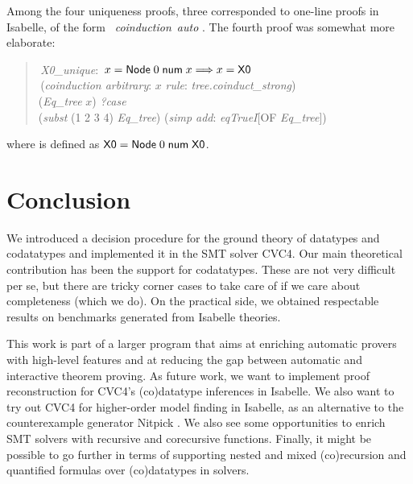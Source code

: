 Among the four uniqueness proofs, three corresponded to one-line
proofs in Isabelle, of the form ~\textit{coinduction}~\textit{auto}
\cite{blanchette-et-al-2014-impl}. The fourth proof was somewhat more elaborate:
%
\begin{quote}
 \,\textit{X0\_unique}: \,$x = \textsf{Node}\;0\;\textsf{num}\; x \Longrightarrow x = \textsf{X0}$ \\
 \,(\textit{coinduction arbitrary}: $x$ \textit{rule}: \textit{tree.coinduct\_strong}) \\
\noindent\hbox{}\quad  {} (\textit{Eq\_tree} $x$)  \textit{?case} \\
\noindent\hbox{}\qquad  {} (\textit{subst} (1 2 3 4) \textit{Eq\_tree}) (\textit{simp add}: \textit{eqTrueI}[OF \textit{Eq\_tree}]) \\
\end{quote}
%
\noindent
where  is defined as $\textsf{X0} =
\textsf{Node}\;0\;\textsf{num}\;\textsf{X0}$.

\section{Conclusion}
\label{sec:conclusion}

We introduced a decision procedure for the ground theory of datatypes and
codatatypes and implemented it in the SMT solver CVC4. Our main theoretical
contribution has been the support for codatatypes. These are not very
difficult per se, but there are tricky corner cases to take care of if we care
about completeness (which we do).
On the practical side, we obtained respectable results on benchmarks generated
from Isabelle theories.

This work is part of a larger program that aims at enriching automatic provers
with high-level features and at reducing the gap between automatic and
interactive theorem proving. As future work, we want to implement proof
reconstruction for CVC4's (co)datatype inferences in Isabelle. We also want to
try out CVC4 for higher-order model finding in Isabelle, as an alternative to
the counterexample generator Nitpick \cite{blanchette-nipkow-2010}. We also
see some opportunities to enrich SMT solvers with recursive and corecursive
functions. Finally, it might be possible to go further in terms of supporting
nested and mixed (co)recursion and quantified formulas over (co)datatypes in
solvers.

\def\ackname{Acknowledgment}
